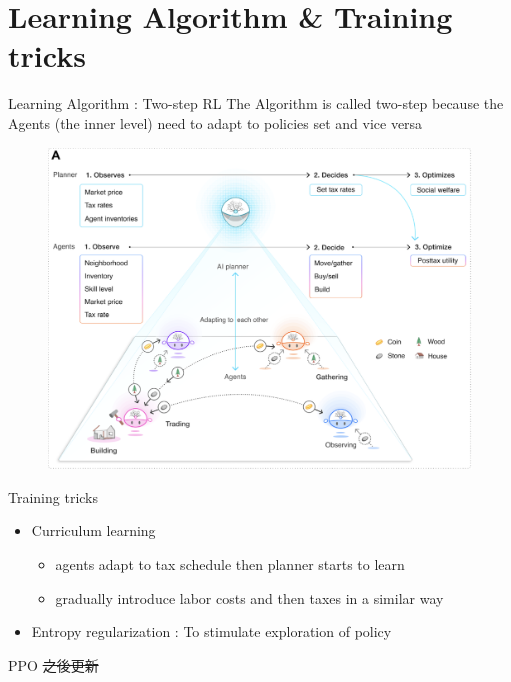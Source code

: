 \documentclass{beamer}
\begin{document}
    \section{Learning Algorithm \& Training tricks}
        \begin{frame}{Learning Algorithm : Two-step RL}
            The Algorithm is called two-step because the Agents (the inner level) need to adapt to policies set and vice versa
            \begin{figure}[h]
            \includegraphics[scale=0.3]{./img/pic1.png}
            \end{figure}
        \end{frame}

        \begin{frame}{Training tricks}
            \begin{itemize}
                \item Curriculum learning
                    \begin{itemize}
                        \item agents adapt to tax schedule then planner starts to learn 
                        \item gradually introduce labor costs and then taxes in a similar way
                    \end{itemize}
                \item Entropy regularization : To stimulate exploration of policy
            \end{itemize}
        \end{frame}

        \begin{frame}{PPO}
            \sout{之後更新}
        \end{frame}
\end{document}
